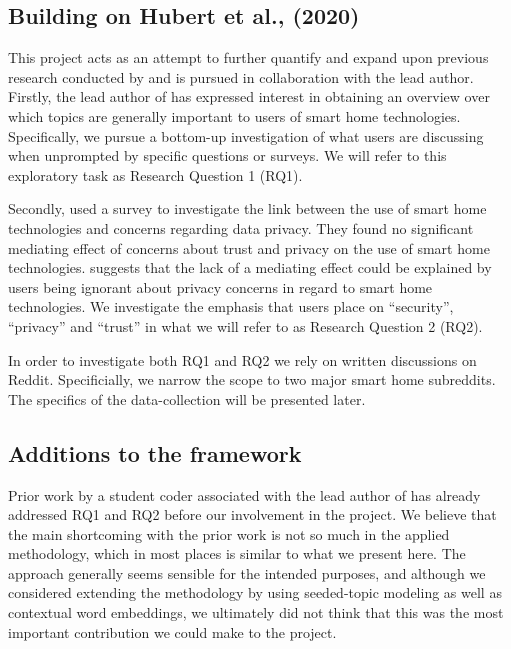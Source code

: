 \documentclass{article}
\begin{document}
    \subsection{Building on Hubert et al., (2020)}
    This project acts as an attempt to further quantify and expand upon previous research conducted by  and is pursued in collaboration with the lead author. Firstly, the lead author of  has expressed interest in obtaining an overview over which topics are generally important to users of smart home technologies. Specifically, we pursue a bottom-up investigation of what users are discussing when unprompted by specific questions or surveys. We will refer to this exploratory task as Research Question 1 (RQ1). 

Secondly,  used a survey to investigate the link between the use of smart home technologies and concerns regarding data privacy. They found no significant mediating effect of concerns about trust and privacy on the use of smart home technologies.  suggests that the lack of a mediating effect could be explained by users being ignorant about privacy concerns in regard to smart home technologies. We investigate the emphasis that users place on “security”, “privacy” and “trust” in what we will refer to as Research Question 2 (RQ2). 

In order to investigate both RQ1 and RQ2 we rely on written discussions on Reddit. Specificially, we narrow the scope to two major smart home subreddits. The specifics of the data-collection will be presented later. 

    \subsection{Additions to the framework}
    Prior work by a student coder associated with the lead author of  has already addressed RQ1 and RQ2 before our involvement in the project. We believe that the main shortcoming with the prior work is not so much in the applied methodology, which in most places is similar to what we present here. The approach generally seems sensible for the intended purposes, and although we considered extending the methodology by using seeded-topic modeling as well as contextual word embeddings, we ultimately did not think that this was the most important contribution we could make to the project. 
\end{document}
